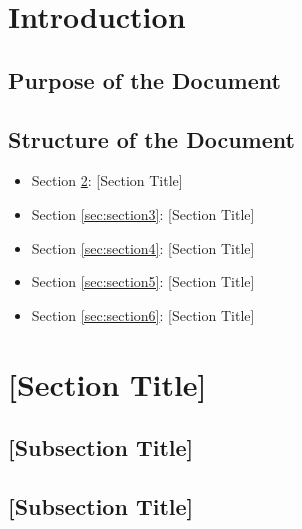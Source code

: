 \documentclass[a4paper,12pt]{article}
\begin{document}
\vspace*{2cm}

\disclaimer

\newpage

\tableofcontents %

\newpage

\section{{Introduction}}

\lipsum[1-2]

\subsection{{Purpose of the Document}}
\lipsum[3]

\subsection{{Structure of the Document}}
\begin{itemize}
    \item Section \ref{sec:section2}: [Section Title]
    \item Section \ref{sec:section3}: [Section Title]
    \item Section \ref{sec:section4}: [Section Title]
    \item Section \ref{sec:section5}: [Section Title]
    \item Section \ref{sec:section6}: [Section Title]
\end{itemize}

\newpage

\section{{[Section Title]}}
\label{sec:section2}

\lipsum[4-5]

\subsection{{[Subsection Title]}}
\lipsum[6]

\subsection{{[Subsection Title]}}
\lipsum[7]

\newpage
\end{document}
